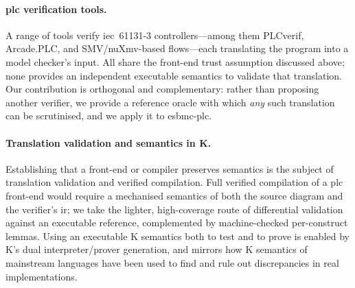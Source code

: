 \paragraph{\gls{plc} verification tools.} A range of tools verify
\gls{iec}~61131-3 controllers---among them PLCverif, Arcade.PLC, and SMV/nuXmv-based
flows---each translating the program into a model checker's input. All share the
front-end trust assumption discussed above; none provides an independent
executable semantics to validate that translation. Our contribution is orthogonal
and complementary: rather than proposing another verifier, we provide a reference
oracle with which \emph{any} such translation can be scrutinised, and we apply it
to \gls{esbmc}-\gls{plc}.

\paragraph{Translation validation and semantics in \textsf{K}.} Establishing that
a front-end or compiler preserves semantics is the subject of translation
validation and verified compilation. Full verified compilation of a \gls{plc}
front-end would require a mechanised semantics of both the source diagram and the
verifier's \gls{ir}; we take the lighter, high-coverage route of differential
validation against an executable reference, complemented by machine-checked
per-construct lemmas. Using an executable \textsf{K} semantics both to test and to
prove is enabled by \textsf{K}'s dual interpreter/prover generation, and mirrors
how \textsf{K} semantics of mainstream languages have been used to find and rule
out discrepancies in real implementations.
